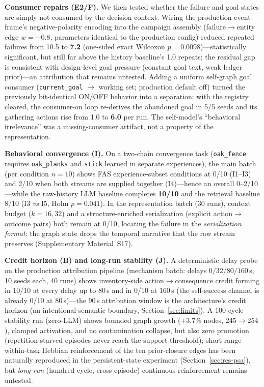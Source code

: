 \documentclass[10pt,a4paper]{article}
\begin{document}
\textbf{Consumer repairs (E2/F).} We then tested whether the failure
and goal states are simply not consumed by the decision context.
Wiring the production event-frame's negative-polarity encoding into
the campaign assembly (failure$\rightarrow$entity edge $w{=}{-}0.8$,
parameters identical to the production config) reduced repeated
failures from 10.5 to \textbf{7.2} (one-sided exact Wilcoxon
$p{=}0.0098$)---statistically significant, but still far above the history baseline's 1.0 repeats; the residual gap is consistent with design-level goal pressure (constant goal text, weak ledger prior)---an attribution that remains untested. Adding a uniform self-graph goal consumer
(\texttt{current\_goal} $\rightarrow$ working set; production default
off) turned the previously bit-identical ON/OFF behavior into a
separation: with the registry cleared, the consumer-on loop re-derives
the abandoned goal in 5/5 seeds and its gathering actions rise from
1.0 to \textbf{6.0} per run. The self-model's ``behavioral
irrelevance'' was a missing-consumer artifact, not a property of the
representation.

\textbf{Behavioral convergence (I).} On a two-chain convergence task
(\texttt{oak\_fence} requires \texttt{oak\_planks} and \texttt{stick}
learned in separate experiences), the main batch (per condition
$n{=}10$) shows FAS experience-subset conditions at 0/10 (I1--I3) and
2/10 when both streams are supplied together (I4)---hence an overall
0--2/10---while the raw-history LLM baseline completes \textbf{10/10}
and the retrieval baseline 8/10 (I3 \emph{vs} I5, Holm $p{=}0.041$).
In the representation batch (30 runs), context budget ($k{=}16,32$)
and a structure-enriched serialization (explicit
action$\rightarrow$outcome pairs) both remain at 0/10, locating the
failure in the \emph{serialization format}: the graph state drops the
temporal narrative that the raw stream preserves (Supplementary
Material~S17).

\textbf{Credit horizon (B) and long-run stability (J).} A deterministic
delay probe on the production attribution pipeline (mechanism batch:
delays $0/32/80/160$\,s, 10 seeds each, 40 runs) shows inventory-side
action$\rightarrow$consequence credit forming in 10/10 at every delay
up to 80\,s and in 0/10 at 160\,s (the self-success channel is already
0/10 at 80\,s)---the 90\,s attribution window is the
architecture's credit horizon (an intentional semantic boundary,
Section~\ref{sec:limits}). A 100-cycle stability run (zero-LLM) shows
bounded graph growth ($+3.7\%$ nodes, $245{\rightarrow}254$), clamped
activation, and no contamination collapse, but also zero promotion
(repetition-starved episodes never reach the support threshold);
short-range within-task Hebbian reinforcement of the ten prior-closure
edges has been naturally reproduced in the persistent-state experiment
(Section~\ref{sec:res-psa}), but \emph{long-run} (hundred-cycle,
cross-episode) continuous reinforcement remains untested.
\end{document}
